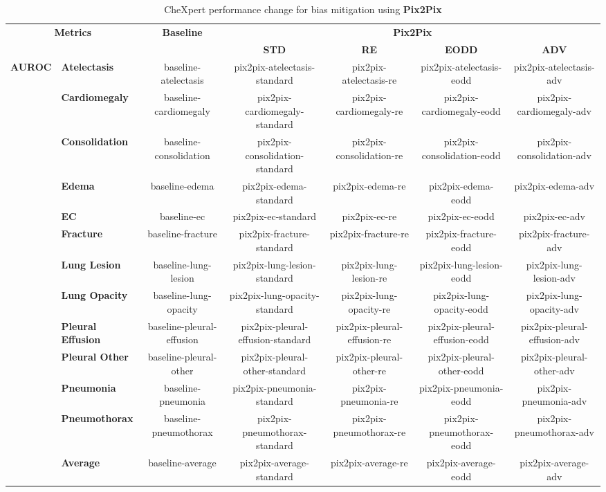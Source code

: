 \begin{table}[]
    \centering
    \caption{CheXpert performance change for bias mitigation using \textbf{Pix2Pix}}
    \label{tab:chex_perf_pix2pix}
    \begin{tabular}{ll|c|cccc}
    \hline
    \multicolumn{2}{c|}{\multirow{2}{*}{\textbf{Metrics}}} 
    & \multirow{2}{*}{\textbf{Baseline}} 
    & \multicolumn{4}{c}{\textbf{Pix2Pix}} \\
    \cline{4-7}
     &  &  & \textbf{STD} & \textbf{RE} & \textbf{EODD} & \textbf{ADV} \\
    \hline

    \multirow{13}{*}{\textbf{AUROC}} 
    & \textbf{Atelectasis} & baseline-atelectasis & pix2pix-atelectasis-standard & pix2pix-atelectasis-re & pix2pix-atelectasis-eodd & pix2pix-atelectasis-adv \\
    & \textbf{Cardiomegaly} & baseline-cardiomegaly & pix2pix-cardiomegaly-standard & pix2pix-cardiomegaly-re & pix2pix-cardiomegaly-eodd & pix2pix-cardiomegaly-adv \\
    & \textbf{Consolidation} & baseline-consolidation & pix2pix-consolidation-standard & pix2pix-consolidation-re & pix2pix-consolidation-eodd & pix2pix-consolidation-adv \\
    & \textbf{Edema} & baseline-edema & pix2pix-edema-standard & pix2pix-edema-re & pix2pix-edema-eodd & pix2pix-edema-adv \\
    & \textbf{EC} & baseline-ec & pix2pix-ec-standard & pix2pix-ec-re & pix2pix-ec-eodd & pix2pix-ec-adv \\
    & \textbf{Fracture} & baseline-fracture & pix2pix-fracture-standard & pix2pix-fracture-re & pix2pix-fracture-eodd & pix2pix-fracture-adv \\
    & \textbf{Lung Lesion} & baseline-lung-lesion & pix2pix-lung-lesion-standard & pix2pix-lung-lesion-re & pix2pix-lung-lesion-eodd & pix2pix-lung-lesion-adv \\
    & \textbf{Lung Opacity} & baseline-lung-opacity & pix2pix-lung-opacity-standard & pix2pix-lung-opacity-re & pix2pix-lung-opacity-eodd & pix2pix-lung-opacity-adv \\
    & \textbf{Pleural Effusion} & baseline-pleural-effusion & pix2pix-pleural-effusion-standard & pix2pix-pleural-effusion-re & pix2pix-pleural-effusion-eodd & pix2pix-pleural-effusion-adv \\
    & \textbf{Pleural Other} & baseline-pleural-other & pix2pix-pleural-other-standard & pix2pix-pleural-other-re & pix2pix-pleural-other-eodd & pix2pix-pleural-other-adv \\
    & \textbf{Pneumonia} & baseline-pneumonia & pix2pix-pneumonia-standard & pix2pix-pneumonia-re & pix2pix-pneumonia-eodd & pix2pix-pneumonia-adv \\
    & \textbf{Pneumothorax} & baseline-pneumothorax & pix2pix-pneumothorax-standard & pix2pix-pneumothorax-re & pix2pix-pneumothorax-eodd & pix2pix-pneumothorax-adv \\
    & \textbf{Average} & baseline-average & pix2pix-average-standard & pix2pix-average-re & pix2pix-average-eodd & pix2pix-average-adv \\
    \cline{1-2}
    

\end{tabular}
\end{table}
